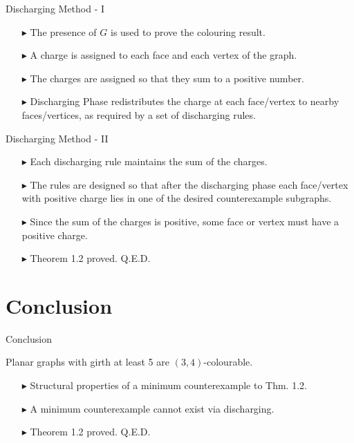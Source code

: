 \documentclass[10pt, compress]{beamer}
\begin{document}
\begin{frame}{Discharging Method - I}
\begin{itemize}[itemsep=0.5cm]
\item[$\blacktriangleright$] The presence of $G$ is used to prove the colouring result.
\item[$\blacktriangleright$] A charge is assigned to each face and each vertex of the graph.
\item[$\blacktriangleright$] The charges are assigned so that they sum to a positive number. 
\item[$\blacktriangleright$] Discharging Phase 
redistributes the charge at each face/vertex to nearby faces/vertices, as required by a set of discharging rules.
\end{itemize}
\end{frame}

\begin{frame}{Discharging Method - II}
\begin{itemize}[itemsep=0.5cm]
\item[$\blacktriangleright$] Each discharging rule maintains the sum of the charges. \item[$\blacktriangleright$] The rules are designed so that after the discharging phase each face/vertex with positive charge lies in one of the desired counterexample subgraphs.
\item[$\blacktriangleright$] Since the sum of the charges is positive, some face or vertex must have a positive charge.
\item[$\blacktriangleright$] Theorem 1.2 proved. Q.E.D.
\end{itemize}
\end{frame}

\section{Conclusion}

\begin{frame}{Conclusion}
\begin{theorem}[1.2]
Planar graphs with girth at least 5 are $(3,4)$-colourable.
\end{theorem}
\begin{itemize}[itemsep=0.5cm]
\item[$\blacktriangleright$] Structural properties of a minimum counterexample to Thm. 1.2.
\item[$\blacktriangleright$] A minimum counterexample cannot exist via discharging.
\item[$\blacktriangleright$] Theorem 1.2 proved. Q.E.D.
\end{itemize}
\end{frame}
\end{document}

